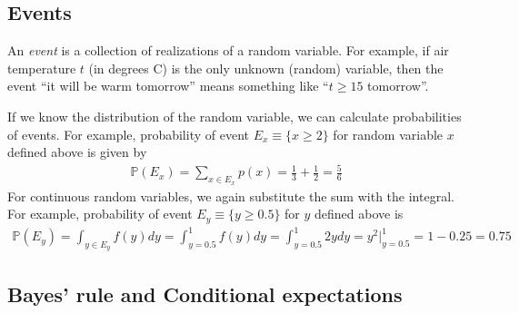 \documentclass{article}
\begin{document}
\subsection{Events}

An \emph{event} is a collection of realizations of a random variable. For example, if air temperature $t$ (in degrees C) is the only unknown (random) variable, then the event ``it will be warm tomorrow'' means something like ``$t \geq 15$ tomorrow''.

If we know the distribution of the random variable, we can calculate probabilities of events. For example, probability of event $E_x \equiv \{x \geq 2\}$ for random variable $x$ defined above is given by
\begin{align*}
	\mathbb{P}(E_x) = \sum_{x \in E_x} p(x) = \frac{1}{3} + \frac{1}{2} = \frac{5}{6}
\end{align*}
For continuous random variables, we again substitute the sum with the integral. For example, probability of event $E_y \equiv \{y \geq 0.5\}$ for $y$ defined above is
\begin{align*}
	\mathbb{P}(E_y) = \int_{y \in E_y} f(y) dy = \int_{y=0.5}^1 f(y) dy  = \int_{y=0.5}^1 2y dy = y^2 |_{y=0.5}^1 = 1 - 0.25 = 0.75
\end{align*}


\subsection{Bayes' rule and Conditional expectations}
\end{document}
